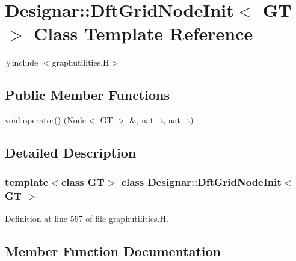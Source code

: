 \hypertarget{class_designar_1_1_dft_grid_node_init}{}\section{Designar\+:\+:Dft\+Grid\+Node\+Init$<$ GT $>$ Class Template Reference}
\label{class_designar_1_1_dft_grid_node_init}


{\ttfamily \#include $<$graphutilities.\+H$>$}

\subsection*{Public Member Functions}
\begin{DoxyCompactItemize}
\item 
void \hyperlink{class_designar_1_1_dft_grid_node_init_a9608556db92626f723c7acb35751041b}{operator()} (\hyperlink{namespace_designar_a5af326c65aa2bd26b26c410f2030d09e}{Node}$<$ \hyperlink{demo-buildgraph_8_c_a3001c40d2c31ca87ed96cd7d1334a55e}{GT} $>$ \&, \hyperlink{namespace_designar_aa72662848b9f4815e7bf31a7cf3e33d1}{nat\+\_\+t}, \hyperlink{namespace_designar_aa72662848b9f4815e7bf31a7cf3e33d1}{nat\+\_\+t})
\end{DoxyCompactItemize}


\subsection{Detailed Description}
\subsubsection*{template$<$class GT$>$\newline
class Designar\+::\+Dft\+Grid\+Node\+Init$<$ G\+T $>$}



Definition at line 597 of file graphutilities.\+H.



\subsection{Member Function Documentation}
\mbox{\label{class_designar_1_1_dft_grid_node_init_a9608556db92626f723c7acb35751041b}} 
